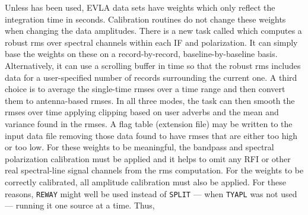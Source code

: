 Unless {\tt {}} has been used, EVLA data sets have weights
which only reflect the integration time in seconds.  Calibration
routines do not change these weights when changing the data
amplitudes.  There is a new task called {\tt {}} which
computes a robust rms over spectral channels within each IF and
polarization.  It can simply base the weights on these on a
record-by-record, baseline-by-baseline basis.  Alternatively, it can
use a scrolling buffer in time so that the robust rms includes data
for a user-specified number of records surrounding the current one.  A
third choice is to average the single-time rmses over a time range and
then convert them to antenna-based rmses.  In all three modes, the
task can then smooth the rmses over time applying clipping based on
user adverbs and the mean and variance found in the rmses.  A flag
table (extension file) may be written to the input data file removing
those data found to have rmses that are either too high or too low.
For these weights to be meaningful, the bandpass and spectral
polarization calibration must be applied and it helps to omit any RFI
or other real spectral-line signal channels from the rms computation.
For the weights to be correctly calibrated, all amplitude calibration
must also be applied.  For these reasons, {\tt REWAY} might well be
used instead of {\tt SPLIT} --- when {\tt TYAPL} was not used ---
running it one source at a time.  Thus,

